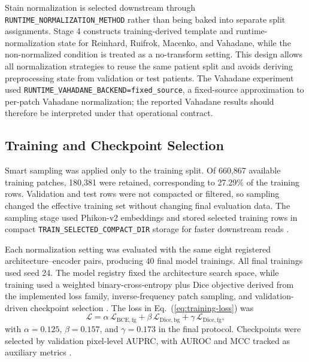 \documentclass[a4paper,fleqn]{cas-dc}
\newcommand{\RuntimeNormMethod}{\texttt{RUNTIME\_\allowbreak NORMALIZATION\_\allowbreak METHOD}}
\newcommand{\RuntimeVahadaneFixedSource}{\texttt{RUNTIME\_\allowbreak VAHADANE\_\allowbreak BACKEND=\allowbreak fixed\_\allowbreak source}}
\newcommand{\TrainSelectedCompactDir}{\texttt{TRAIN\_\allowbreak SELECTED\_\allowbreak COMPACT\_\allowbreak DIR}}
\begin{document}
Stain normalization is selected downstream through \RuntimeNormMethod{} rather than being baked into separate split assignments. Stage 4 constructs training-derived template and runtime-normalization state for Reinhard, Ruifrok, Macenko, and Vahadane, while the non-normalized condition is treated as a no-transform setting. This design allows all normalization strategies to reuse the same patient split and avoids deriving preprocessing state from validation or test patients. The Vahadane experiment used \RuntimeVahadaneFixedSource{}, a fixed-source approximation to per-patch Vahadane normalization; the reported Vahadane results should therefore be interpreted under that operational contract.

\subsection{Training and Checkpoint Selection}

Smart sampling was applied only to the training split. Of 660,867 available training patches, 180,381 were retained, corresponding to 27.29\% of the training rows. Validation and test rows were not compacted or filtered, so sampling changed the effective training set without changing final evaluation data. The sampling stage used Phikon-v2 embeddings and stored selected training rows in compact \TrainSelectedCompactDir{} storage for faster downstream reads \cite{campanella2025clinical,oquab2024dinov2,he2009imbalanced}.

Each normalization setting was evaluated with the same eight registered architecture--encoder pairs, producing 40 final model trainings. All final trainings used seed 24. The model registry fixed the architecture search space, while training used a weighted binary-cross-entropy plus Dice objective derived from the implemented loss family, inverse-frequency patch sampling, and validation-driven checkpoint selection \cite{khened2021generalized,he2009imbalanced}. The loss in Eq.~(\ref{eq:training-loss}) was
\begin{equation}
\mathcal{L} =
\alpha\,\mathcal{L}_{\mathrm{BCE},\mathrm{fg}}
+ \beta\,\mathcal{L}_{\mathrm{Dice},\mathrm{bg}}
+ \gamma\,\mathcal{L}_{\mathrm{Dice},\mathrm{fg}},
\label{eq:training-loss}
\end{equation}
with $\alpha=0.125$, $\beta=0.157$, and $\gamma=0.173$ in the final protocol. Checkpoints were selected by validation pixel-level AUPRC, with AUROC and MCC tracked as auxiliary metrics \cite{saito2015precision,matthews1975comparison}.
\end{document}

